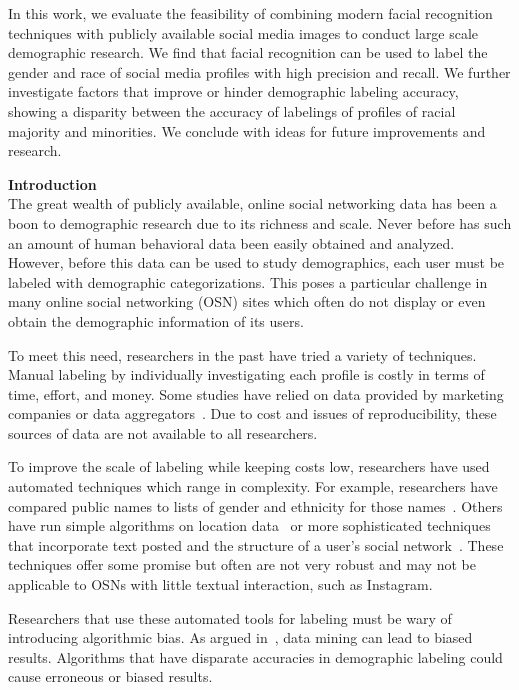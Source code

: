In this work, we evaluate the feasibility of combining modern facial recognition techniques with publicly available social media images to conduct large scale demographic research.
We find that facial recognition can be used to label the gender and race of social media profiles with high precision and recall.
We further investigate factors that improve or hinder demographic labeling accuracy, showing a disparity between the accuracy of labelings of profiles of racial majority and minorities.
We conclude with ideas for future improvements and research.


\textbf{Introduction} \\
The great wealth of publicly available, online social networking data has been a boon to demographic research due to its richness and scale.
Never before has such an amount of human behavioral data been easily obtained and analyzed.
However, before this data can be used to study demographics, each user must be labeled with demographic categorizations. 
This poses a particular challenge in many online social networking (OSN) sites which often do not display or even obtain the demographic information of its users.

To meet this need, researchers in the past have tried a variety of techniques.
Manual labeling by individually investigating each profile is costly in terms of time, effort, and money.
Some studies have relied on data provided by marketing companies or data aggregators~\cite{Goel:2012ut, biinferring}.
Due to cost and issues of reproducibility, these sources of data are not available to all researchers.

To improve the scale of labeling while keeping costs low, researchers have used automated techniques which range in complexity.
For example, researchers have compared public names to lists of gender and ethnicity for those names~\cite{mislove-2011-twitter, ICWSM101534}.
Others have run simple algorithms on location data~\cite{riederer2015cosn} or more sophisticated techniques that incorporate text posted and the structure of a user's social network~\cite{ICWSM112886, pennacchiotti2011democrats}.
These techniques offer some promise but often are not very robust and may not be applicable to OSNs with little textual interaction, such as Instagram.

Researchers that use these automated tools for labeling must be wary of introducing algorithmic bias.
As argued in~\cite{Selbst:2014wi}, data mining can lead to biased results.
Algorithms that have disparate accuracies in demographic labeling could cause erroneous or biased results.

